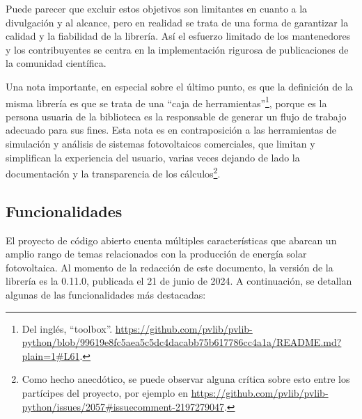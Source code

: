 Puede parecer que excluir estos objetivos son limitantes en cuanto a la divulgación y al alcance, pero en realidad se trata de una forma de garantizar la calidad y la fiabilidad de la librería. Así el esfuerzo limitado de los mantenedores y los contribuyentes se centra en la implementación rigurosa de publicaciones de la comunidad científica.

Una nota importante, en especial sobre el último punto, es que la definición de la misma librería es que se trata de una ``caja de herramientas''\footnote{Del inglés, ``toolbox''. \url{https://github.com/pvlib/pvlib-python/blob/99619e8fc5aea5c5dc4dacabb75b617786cc4a1a/README.md?plain=1\#L61}.}, porque es la persona usuaria de la biblioteca es la responsable de generar un flujo de trabajo adecuado para sus fines. Esta nota es en contraposición a las herramientas de simulación y análisis de sistemas fotovoltaicos comerciales, que limitan y simplifican la experiencia del usuario, varias veces dejando de lado la \gls{documentación} y la transparencia de los cálculos\footnote{Como hecho anecdótico, se puede observar alguna crítica sobre esto entre los partícipes del proyecto, por ejemplo en \url{https://github.com/pvlib/pvlib-python/issues/2057\#issuecomment-2197279047}.}.

\subsection{Funcionalidades} \label{ssct:pvlib:funcionalidades}

El proyecto de código abierto \pvlibpy{} cuenta múltiples características que abarcan un amplio rango de temas relacionados con la producción de energía solar fotovoltaica. Al momento de la redacción de este documento, la versión de la librería es la 0.11.0, publicada el 21 de junio de 2024. A continuación, se detallan algunas de las funcionalidades más destacadas:

